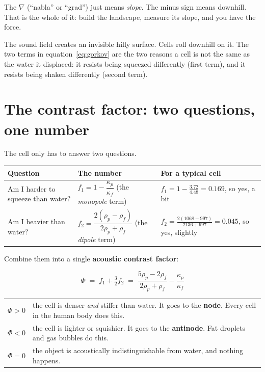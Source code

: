 \documentclass[11pt,a4paper]{article}
\newcommand{\sym}[2]{\textcolor{ink}{$#1$} & #2 \\}
\begin{document}
The $\nabla$ (``nabla'' or ``grad'') just means \emph{slope}. The minus sign
means downhill. That is the whole of it: build the landscape, measure its
slope, and you have the force.

\begin{plain}
The sound field creates an invisible hilly surface. Cells roll downhill on it.
The two terms in equation~\eqref{eq:gorkov} are the two reasons a cell is not
the same as the water it displaced: it resists being squeezed differently
(first term), and it resists being shaken differently (second term).
\end{plain}

\section{The contrast factor: two questions, one number}

The cell only has to answer two questions.

\begin{center}\small
\begin{tabular}{p{4.4cm}p{5.2cm}p{5.2cm}}
\toprule
\textbf{Question} & \textbf{The number} & \textbf{For a typical cell} \\
\midrule
Am I harder to squeeze than water? &
$f_1 = 1 - \dfrac{\kappa_p}{\kappa_f}$ (the \emph{monopole} term) &
$f_1 = 1 - \frac{3.72}{4.48} = 0.169$, so yes, a bit \\[10pt]
Am I heavier than water? &
$f_2 = \dfrac{2(\rho_p-\rho_f)}{2\rho_p+\rho_f}$ (the \emph{dipole} term) &
$f_2 = \frac{2(1068-997)}{2136+997} = 0.045$, so yes, slightly \\
\bottomrule
\end{tabular}
\end{center}

Combine them into a single \textbf{acoustic contrast factor}:

\begin{equation}
\Phi \;=\; f_1 + \tfrac{3}{2}f_2
\;=\; \frac{5\rho_p-2\rho_f}{2\rho_p+\rho_f}-\frac{\kappa_p}{\kappa_f}
\label{eq:phi}
\end{equation}

\begin{center}\small
\begin{tabular}{ll}
\sym{\Phi>0}{the cell is denser \emph{and} stiffer than water. It goes to the
\textbf{node}. Every cell in the human body does this.}
\sym{\Phi<0}{the cell is lighter or squishier. It goes to the \textbf{antinode}.
Fat droplets and gas bubbles do this.}
\sym{\Phi=0}{the object is acoustically indistinguishable from water, and nothing happens.}
\end{tabular}
\end{center}
\end{document}
